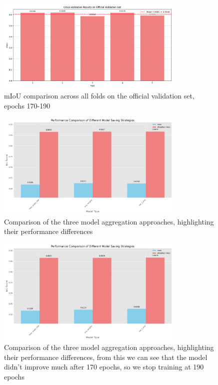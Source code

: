 \documentclass[]{article}
\begin{document}
\begin{figure}[htbp]
		\centering
		\includegraphics[width=0.8\textwidth]{figures/folds_170_190.png}
		\caption{mIoU comparison across all folds on the official validation set, epochs 170-190}
		\label{fig:cross_val_170_190_val}
\end{figure}

\begin{figure}[htbp]
		\centering
		\includegraphics[width=0.8\textwidth]{figures/3model_comparison_170.png}
		\caption{Comparison of the three model aggregation approaches, highlighting their performance differences}
		\label{fig:3model_comparison}
\end{figure}

\begin{figure}[htbp]
		\centering
		\includegraphics[width=0.8\textwidth]{figures/3model_comparison_190.png}
		\caption{Comparison of the three model aggregation approaches, highlighting their performance differences, from this we can see that the model didn't improve much after 170 epochs, so we stop training at 190 epochs}
		\label{fig:3model_comparison_190}
\end{figure}
\end{document}
